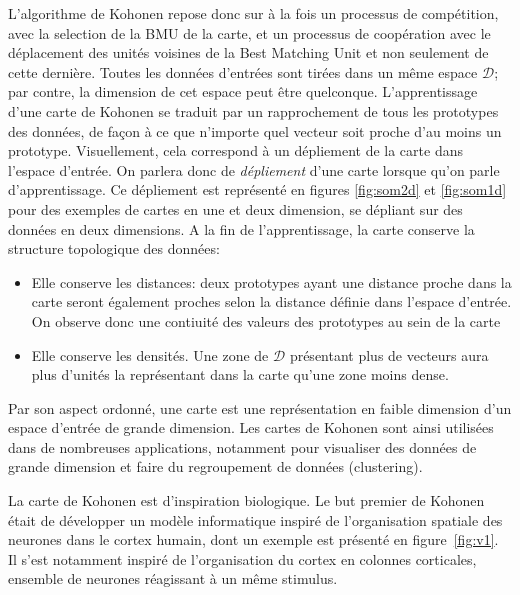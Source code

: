 L'algorithme de Kohonen repose donc sur à la fois un processus de compétition, avec la selection de la BMU de la carte, et un processus de coopération avec le déplacement des unités voisines de la Best Matching Unit et non seulement de cette dernière.
Toutes les données d'entrées sont tirées dans un même espace $\mathcal{D}$; par contre, la dimension de cet espace peut être quelconque.
L'apprentissage d'une carte de Kohonen se traduit par un rapprochement de tous les prototypes des données, de façon à ce que n'importe quel vecteur soit proche d'au moins un prototype. Visuellement, cela correspond à un dépliement de la carte dans l'espace d'entrée. On parlera donc de \emph{dépliement} d'une carte lorsque qu'on parle d'apprentissage. Ce dépliement est représenté en figures \ref{fig:som2d} et \ref{fig:som1d} pour des exemples de cartes en une et deux dimension, se dépliant sur des données en deux dimensions. 
A la fin de l'apprentissage, la carte conserve la structure topologique des données:
\begin{itemize}
\item Elle conserve les distances: deux prototypes ayant une distance proche dans la carte seront également proches selon la distance définie dans l'espace d'entrée. On observe donc une contiuité des valeurs des prototypes au sein de la carte
\item Elle conserve les densités. Une zone de $\mathcal{D}$ présentant plus de vecteurs aura plus d'unités la représentant dans la carte qu'une zone moins dense.
\end{itemize}
Par son aspect ordonné, une carte est une représentation en faible dimension d'un espace d'entrée de grande dimension. Les cartes de Kohonen sont ainsi utilisées dans de nombreuses applications, notamment pour visualiser des données de grande dimension et faire du regroupement de données (clustering). 

La carte de Kohonen est d'inspiration biologique. Le but premier de Kohonen était de développer un modèle informatique inspiré de l'organisation spatiale des neurones dans le cortex humain, dont un exemple est présenté en figure~\ref{fig:v1}. Il s'est notamment inspiré de l'organisation du cortex en colonnes corticales, ensemble de neurones réagissant à un même stimulus.

